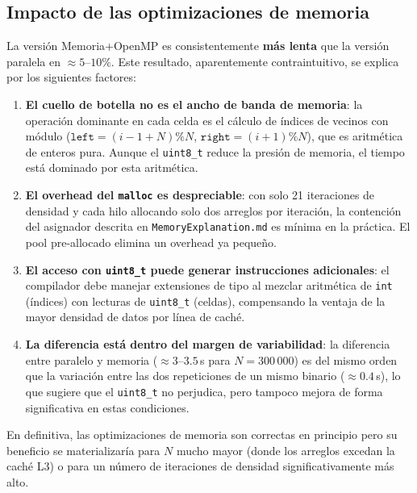 \documentclass{article}
\begin{document}
\subsection{Impacto de las optimizaciones de memoria}

La versi\'on Memoria+OpenMP es consistentemente \textbf{m\'as lenta} que la versi\'on
paralela en $\approx 5$--$10\%$. Este resultado, aparentemente contraintuitivo, se
explica por los siguientes factores:

\begin{enumerate}
    \item \textbf{El cuello de botella no es el ancho de banda de memoria}: la operaci\'on
          dominante en cada celda es el c\'alculo de \'indices de vecinos con m\'odulo
          ($\texttt{left} = (i{-}1{+}N)\%N$, $\texttt{right} = (i{+}1)\%N$), que es
          aritm\'etica de enteros pura. Aunque el \texttt{uint8\_t} reduce la presi\'on de
          memoria, el tiempo est\'a dominado por esta aritm\'etica.
    \item \textbf{El overhead del \texttt{malloc} es despreciable}: con solo 21 iteraciones
          de densidad y cada hilo allocando solo dos arreglos por iteraci\'on, la
          contenci\'on del asignador descrita en \texttt{MemoryExplanation.md} es m\'inima
          en la pr\'actica. El pool pre-allocado elimina un overhead ya peque\~no.
    \item \textbf{El acceso con \texttt{uint8\_t} puede generar instrucciones adicionales}:
          el compilador debe manejar extensiones de tipo al mezclar aritm\'etica de
          \texttt{int} (\'indices) con lecturas de \texttt{uint8\_t} (celdas),
          compensando la ventaja de la mayor densidad de datos por l\'inea de cach\'e.
    \item \textbf{La diferencia est\'a dentro del margen de variabilidad}: la diferencia
          entre paralelo y memoria ($\approx 3$--$3.5$\,s para $N=300\,000$) es del mismo
          orden que la variaci\'on entre las dos repeticiones de un mismo binario
          ($\approx 0.4$\,s), lo que sugiere que el \texttt{uint8\_t} no perjudica, pero
          tampoco mejora de forma significativa en estas condiciones.
\end{enumerate}

En definitiva, las optimizaciones de memoria son correctas en principio pero su beneficio
se materializar\'ia para $N$ mucho mayor (donde los arreglos excedan la cach\'e L3) o
para un n\'umero de iteraciones de densidad significativamente m\'as alto.
\end{document}

